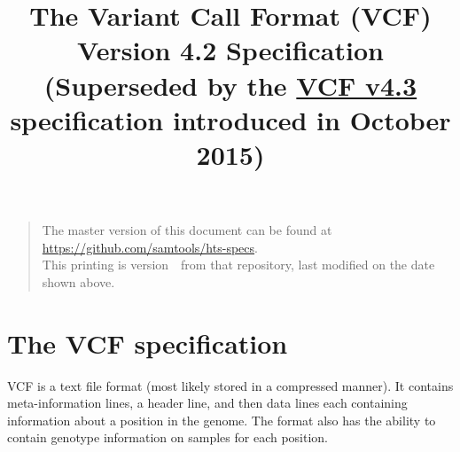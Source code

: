 \documentclass[8pt]{article}
\begin{document}

\title{The Variant Call Format (VCF) Version 4.2 Specification
\normalsize\\[2ex]
(Superseded by the \href{http://samtools.github.io/hts-specs/VCFv4.3.pdf}{VCF v4.3} specification introduced in October 2015)}
\date{\headdate}
\maketitle
\begin{quote}\small
The master version of this document can be found at
\url{https://github.com/samtools/hts-specs}.\\
This printing is version~\commitdesc\ from that repository,
last modified on the date shown above.
\end{quote}
\vspace*{1em}

\section{The VCF specification}
VCF is a text file format (most likely stored in a compressed manner). It contains meta-information lines, a header line, and then data lines each containing information about a position in the genome.
The format also has the ability to contain genotype information on samples for each position.
\end{document}
